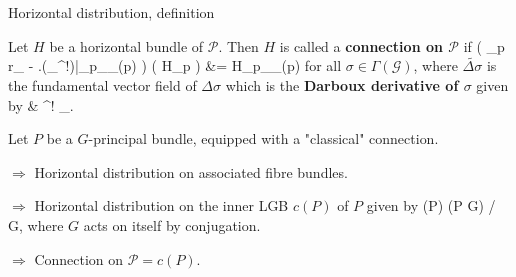 \documentclass[hyperref={pdfpagelabels=false}]{beamer}
\def\ba#1\ea{\begin{align}#1\end{align}}
\theoremstyle{plain}
\theoremstyle{remark}
\begin{document}
{\begin{frame}{Horizontal distribution, definition}
	\begin{definition}[Connection, {[S.-R.\ F.]}]
	Let $H$ be a horizontal bundle of $\mathcal{P}$. Then $H$ is called a \textbf{connection on $\mathcal{P}$} if
	\ba
	\mleft( _p r_{\sigma} - \mleft.\mleft(\pi_{}^!\widetilde{\Delta \sigma}\mright)\mright|_{p\cdot \sigma_{\pi_{}(p)} } \mright)
	\mleft( H_p \mright)
	&=
	H_{p\cdot \sigma_{\pi_{}(p)} }
	\ea
	for all $\sigma \in \Gamma(\mathcal{G})$,
	where $\widetilde{\Delta \sigma}$ is the fundamental vector field of $\Delta\sigma$ which is the \textbf{Darboux derivative of $\sigma$} given by
	\ba
	\Delta\sigma
	&\coloneqq
	\sigma^! \mu_{}.
	\ea
	\end{definition}
\end{frame}

\begin{frame}
\begin{example}
Let $P$ be a $G$-principal bundle, equipped with a "classical" connection. 
\pause

$\Rightarrow$ Horizontal distribution on associated fibre bundles.
\pause

$\Rightarrow$ Horizontal distribution on the inner LGB $c(P)$ of $P$ given by
\ba
c(P) \coloneqq (P \times G) \Big/ G,
\ea
where $G$ acts on itself by conjugation.
\pause

$\Rightarrow$ Connection on $\mathcal{P} = c(P)$.
\end{example}
\end{frame}
}
\end{document}
